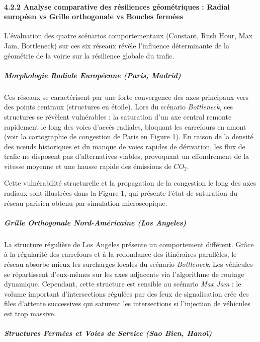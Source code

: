 \documentclass[10pt, a4paper]{article}
\begin{document}
\paragraph{4.2.2 Analyse comparative des résiliences géométriques :
Radial européen vs Grille orthogonale vs Boucles
fermées}\label{analyse-comparative-des-ruxe9siliences-guxe9omuxe9triques-radial-europuxe9en-vs-grille-orthogonale-vs-boucles-fermuxe9es}

L'évaluation des quatre scénarios comportementaux (Constant, Rush Hour,
Max Jam, Bottleneck) sur ces six réseaux révèle l'influence déterminante
de la géométrie de la voirie sur la résilience globale du trafic.

\subparagraph{Morphologie Radiale Européenne (Paris,
Madrid)}\label{morphologie-radiale-europuxe9enne-paris-madrid}

Ces réseaux se caractérisent par une forte convergence des axes
principaux vers des points centraux (structures en étoile). Lors du
scénario \emph{Bottleneck}, ces structures se révèlent vulnérables : la
saturation d'un axe central remonte rapidement le long des voies d'accès
radiales, bloquant les carrefours en amont (voir la cartographie de
congestion de Paris en Figure 1). En raison de la densité des nœuds
historiques et du manque de voies rapides de dérivation, les flux de
trafic ne disposent pas d'alternatives viables, provoquant un
effondrement de la vitesse moyenne et une hausse rapide des émissions de
\(CO_2\).

Cette vulnérabilité structurelle et la propagation de la congestion le
long des axes radiaux sont illustrées dans la Figure 1, qui présente
l'état de saturation du réseau parisien obtenu par simulation
microscopique.

\subparagraph{Grille Orthogonale Nord-Américaine (Los
Angeles)}\label{grille-orthogonale-nord-amuxe9ricaine-los-angeles}

La structure régulière de Los Angeles présente un comportement
différent. Grâce à la régularité des carrefours et à la redondance des
itinéraires parallèles, le réseau absorbe mieux les surcharges locales
du scénario \emph{Bottleneck}. Les véhicules se répartissent d'eux-mêmes
sur les axes adjacents via l'algorithme de routage dynamique. Cependant,
cette structure est sensible au scénario \emph{Max Jam} : le volume
important d'intersections régulées par des feux de signalisation crée
des files d'attente successives qui saturent les intersections si
l'injection de véhicules est trop massive.

\subparagraph{Structures Fermées et Voies de Service (Sao Bien,
Hanoï)}\label{structures-fermuxe9es-et-voies-de-service-sao-bien-hanouxef}
\end{document}

